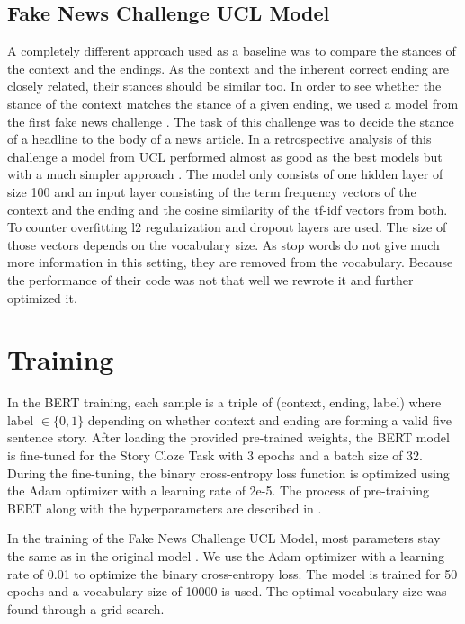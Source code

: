 \documentclass{article}
\begin{document}
\subsection{Fake News Challenge UCL Model}\label{ssec:fnc-stance}
A completely different approach used as a baseline was to compare the stances of the context and the endings. As the context and the inherent correct ending are closely related, their stances should be similar too. 
In order to see whether the stance of the context matches the stance of a given ending, we used a model from the first fake news challenge \cite{FNC}.
The task of this challenge was to decide the stance of a headline to the body of a news article. In a retrospective analysis of this challenge a model from UCL performed almost as good as the best models but with a much simpler approach 
\cite{A_Retrospective_Analysis_of_the_Fake_News_Challenge}. The model only consists of one hidden layer of size 100 and an input layer consisting of the term frequency vectors of the context and the ending and the cosine similarity of the tf-idf vectors from both. To counter overfitting l2 regularization and dropout layers are used. The size of those vectors depends on the vocabulary size. As stop words do not give much more information in this setting, they are removed from the vocabulary. Because the performance of their code was not that well we rewrote it and further optimized it.


\section{Training}

In the BERT training, each sample is a triple of (context, ending, label) where label $\in \{0,1\}$ depending on whether context and ending are forming a valid five sentence story.
After loading the provided pre-trained weights, the BERT model is fine-tuned for the Story Cloze Task with 3 epochs and a batch size of 32. During the fine-tuning, the binary cross-entropy loss function is optimized using the Adam optimizer with a learning rate of 2e-5. The process of pre-training BERT along with the hyperparameters are described in \cite{BERT}.

In the training of the Fake News Challenge UCL Model, most parameters stay the same as in the original model \cite{UCL_model}. We use the Adam optimizer with a learning rate of 0.01 to optimize the binary cross-entropy loss. The model is trained for 50 epochs and a vocabulary size of 10000 is used. The optimal vocabulary size was found through a grid search.
\end{document}
